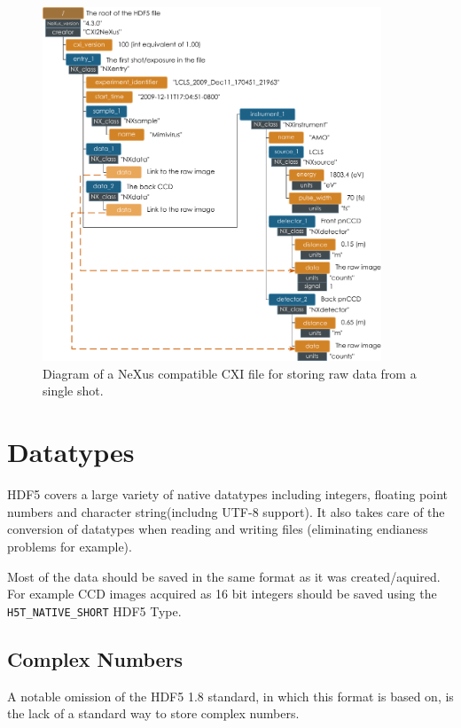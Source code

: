 \documentclass[usletter,11pt]{article}
\begin{document}
\begin{figure}[h!]
\centering
\includegraphics[width=0.9\textwidth]{lcls_camp_cxi_nexus.pdf}
\caption{Diagram of a NeXus compatible CXI file for storing raw data from a single shot.}
\label{fig:lcls_camp_raw_nexus}
\end{figure}


\clearpage
\section{Datatypes}

HDF5 covers a large variety of native datatypes including integers,
floating point numbers and character string(includng UTF-8
support). It also takes care of the conversion of datatypes when
reading and writing files (eliminating endianess problems for
example). 

Most of the data should be saved in the same format as it was
created/aquired. For example CCD images acquired as 16 bit integers
should be saved using the {\tt H5T\_NATIVE\_SHORT} HDF5 Type.

\subsection{Complex Numbers}

A notable omission of the HDF5 1.8 standard, in which this format is
based on, is the lack of a standard way to store complex numbers.
\end{document}
